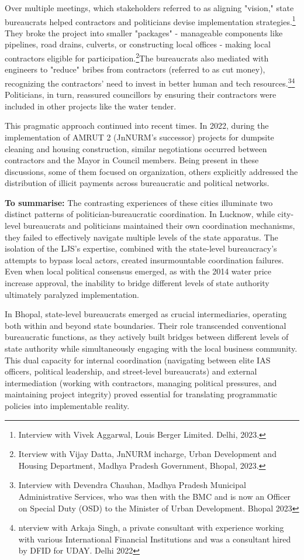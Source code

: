 Over multiple meetings, which stakeholders referred to as aligning "vision," state bureaucrats helped contractors and politicians devise implementation strategies.\footnote{Interview with Vivek Aggarwal, Louis Berger Limited. Delhi, 2023.
} They broke the project into smaller "packages" - manageable components like pipelines, road drains, culverts, or constructing local offices - making local contractors eligible for participation.\footnote{Iterview with Vijay Datta, JnNURM incharge, Urban Development and Housing Department, Madhya Pradesh Government, Bhopal, 2023.
}The bureaucrats also mediated with engineers to "reduce" bribes from contractors (referred to as cut money), recognizing the contractors' need to invest in better human and tech resources.\footnote{Interview with Devendra Chauhan, Madhya Pradesh Municipal Administrative Services, who was then with the BMC and is now an Officer on Special Duty (OSD) to the Minister of Urban Development. Bhopal 2023}\footnote{nterview with Arkaja Singh, a private consultant with experience working with various International Financial Institutions and was a consultant hired by DFID for UDAY. Delhi 2022
} Politicians, in turn, reassured councillors by ensuring their contractors were included in other projects like the water tender.

This pragmatic approach continued into recent times. In 2022, during the implementation of AMRUT 2 (JnNURM's successor) projects for dumpsite cleaning and housing construction, similar negotiations occurred between contractors and the Mayor in Council members. Being present in these discussions, some of them focused on organization, others explicitly addressed the distribution of illicit payments across bureaucratic and political networks.

\vspace{5mm}
\textbf{To summarise: }
The contrasting experiences of these cities illuminate two distinct patterns of politician-bureaucratic  coordination. In Lucknow, while city-level bureaucrats and politicians maintained their own coordination mechanisms, they failed to effectively navigate multiple levels of the state apparatus. The isolation of the LJS's expertise, combined with the state-level bureaucracy's attempts to bypass local actors, created insurmountable coordination failures. Even when local political consensus emerged, as with the 2014 water price increase approval, the inability to bridge different levels of state authority ultimately paralyzed implementation.

In Bhopal, state-level bureaucrats emerged as crucial intermediaries, operating both within and beyond state boundaries. Their role transcended conventional bureaucratic functions, as they actively built bridges between different levels of state authority while simultaneously engaging with the local business community. This dual capacity for internal coordination (navigating between elite IAS officers, political leadership, and street-level bureaucrats) and external intermediation (working with contractors, managing political pressures, and maintaining project integrity) proved essential for translating programmatic policies into implementable reality. 

